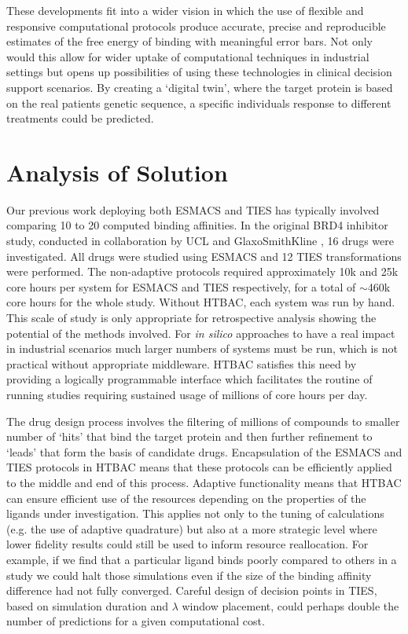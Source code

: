 \documentclass[conference]{IEEEtran}
\begin{document}
These developments fit into a wider vision in which the use of
flexible and responsive computational protocols produce accurate,
precise and reproducible estimates of the free energy of binding with
meaningful error bars. Not only would this allow for wider uptake of
computational techniques in industrial settings but opens up possibilities
of using these technologies in clinical decision support scenarios. By creating
a `digital twin', where the target protein is based on the real patients
genetic sequence, a specific individuals response to different
treatments could be predicted.


\section{Analysis of Solution}\label{sec:analysis}

Our previous work deploying both ESMACS and TIES has typically involved 
comparing 10 to 20 computed binding affinities. In the original BRD4 inhibitor 
study, conducted in collaboration by UCL and GlaxoSmithKline \cite{Wan2017brd4}, 
16 drugs were investigated. All drugs were studied using ESMACS and 12 TIES 
transformations were performed. The non-adaptive protocols required 
approximately 10k and 25k core hours per system for ESMACS and TIES 
respectively, for a total of  $\sim$460k core hours for the whole study. Without 
HTBAC, each system was run by hand. This scale of study is only appropriate for 
retrospective analysis showing the potential of the methods involved. For 
\textit{in silico} approaches to have a real impact in industrial scenarios much 
larger numbers of systems must be run, which is not practical without 
appropriate middleware. HTBAC satisfies this need by providing a logically 
programmable interface which facilitates the routine of running studies 
requiring sustained usage of millions of core hours per day.

The drug design process involves the filtering of millions of compounds to  
smaller number of `hits' that bind the target protein and then further  
refinement to `leads' that form the basis of candidate drugs. Encapsulation of 
the ESMACS and TIES protocols in HTBAC means that these protocols can be 
efficiently applied to the middle and end of this process. Adaptive 
functionality means that HTBAC can ensure efficient use of the resources 
depending on the properties of the ligands under investigation. This applies 
not only to the tuning of calculations (e.g. the use of adaptive quadrature) 
but also at a more strategic level where lower fidelity results could still be 
used to inform resource reallocation. For example, if we find that a particular 
ligand binds poorly compared to others in a study we could halt those 
simulations even if the size of the binding affinity difference had not fully 
converged. Careful design of decision points in TIES, based on simulation 
duration and $\lambda$ window placement, could perhaps double the number of 
predictions for a given computational cost.
\end{document}
